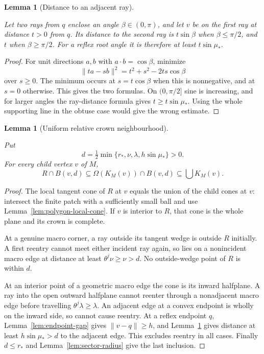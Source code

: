 \documentclass[11pt,a4paper]{article}
\newtheorem{lemma}[definition]{Lemma}
\theoremstyle{remark}
\newcommand{\lean}[1]{}
\newcommand{\uses}[1]{}
\begin{document}
\begin{lemma}[Distance to an adjacent ray]
\label{lem:ray-bound}
\lean{Tilings.Crowns.distanceToReflexBoundaryRay}
\uses{def:crown-separation}
Let two rays from $q$ enclose an angle $\beta\in(0,\pi)$, and let $v$ be
on the first ray at distance $t>0$ from $q$.  Its distance to the second
ray is $t\sin\beta$ when $\beta\le\pi/2$, and $t$ when
$\beta\ge\pi/2$.  For a reflex root angle it is therefore at least
$t\sin\mu_*$.
\end{lemma}
\begin{proof}
For unit directions $a,b$ with $a\mathbin{\cdot}b=\cos\beta$, minimize
\[
  \lVert ta-sb\rVert^2=t^2+s^2-2ts\cos\beta
\]
over $s\ge0$.  The minimum occurs at $s=t\cos\beta$ when this is
nonnegative, and at $s=0$ otherwise.  This gives the two formulas.  On
$(0,\pi/2]$ sine is increasing, and for larger angles the ray-distance
formula gives $t\ge t\sin\mu_*$.  Using the whole supporting line in
the obtuse case would give the wrong estimate.
\end{proof}

\begin{lemma}[Uniform relative crown neighbourhood]
\label{lem:relative-crown-ball}
\lean{Tilings.Crowns.uniformRelativeCrownBall}
\uses{def:crown-sector,def:macro-boundary,def:crown-separation,lem:sector-radius,lem:macrocorner,lem:endpoint-gap,lem:ray-bound}
Put
\[
 d=\tfrac12\min\{r_*,\nu,\lambda,h\sin\mu_*\}>0.
\]
For every child vertex $v$ of $M$,
\[
 R\cap B(v,d)\subseteq\Omega(K_M(v))\cap B(v,d)
                    \subseteq\bigcup K_M(v).
\]
\end{lemma}
\begin{proof}
The local tangent cone of $R$ at $v$ equals the union of the child cones
at $v$: intersect the finite patch with a sufficiently small ball and
use Lemma~\ref{lem:polygon-local-cone}.  If $v$ is interior to $R$, that
cone is the whole plane and its crown is complete.

At a genuine macro corner, a ray outside its tangent wedge is outside
$R$ initially.  A first reentry cannot meet either incident ray again,
so lies on a nonincident macro edge at distance at least
$\theta^j\nu\ge\nu>d$.  No outside-wedge point of $R$ is within $d$.

At an interior point of a geometric macro edge the cone is its inward
halfplane.  A ray into the open outward halfplane cannot reenter through
a nonadjacent macro edge before travelling $\theta^j\lambda\ge\lambda$.
An adjacent edge at a convex endpoint is wholly on the inward side, so
cannot cause reentry.  At a reflex endpoint $q$,
Lemma~\ref{lem:endpoint-gap} gives $\lVert v-q\rVert\ge h$, and
Lemma~\ref{lem:ray-bound} gives distance at least $h\sin\mu_*>d$ to
the adjacent edge.  This excludes reentry in all cases.  Finally
$d\le r_*$ and Lemma~\ref{lem:sector-radius} give the last inclusion.
\end{proof}
\end{document}

